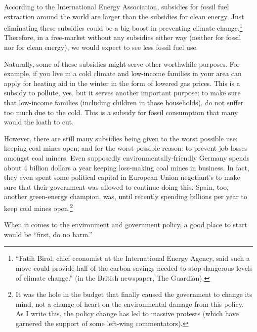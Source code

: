 According to the International Energy Association, subsidies for fossil fuel
extraction around the world are larger than the subsidies for clean energy.
Just eliminating these subsidies could be a big boost in preventing climate
change.\footnote{``Fatih Birol, chief
economist at the International Energy Agency, said such a move could
provide half of the carbon savings needed to stop dangerous levels of climate
change.'' (in the British newspaper, The Guardian).%
} Therefore, in a free-market without any subsidies either way (neither for
fossil nor for clean energy), we would expect to see less fossil fuel use.

Naturally, some of these subsidies might serve other worthwhile purposes. For
example, if you live in a cold climate and low-income families in your area can
apply for heating aid in the winter in the form of lowered gas prices. This is
a subsidy to pollute, yes, but it serves another important purpose: to make
sure that low-income families (including children in those households), do not
suffer too much due to the cold. This is a subsidy for fossil consumption that
many would the loath to cut.


However, there are still many subsidies being given to the worst possible use:
keeping coal mines open; and for the worst possible reason: to prevent job
losses amongst coal miners. Even supposedly environmentally-friendly Germany
spends about 4 billion dollars a year keeping loss-making coal mines in
business. In fact, they even spent some political capital in European Union
negotiant's to make sure that their government was allowed to continue doing
this. Spain, too, another green-energy champion, was, until recently spending
billions per year to keep coal mines open.\footnote{It was the hole in the
budget that finally caused the government to change its mind, not a change of
heart on the environmental damage from this policy. As I write this, the policy
change has led to massive protests (which have garnered the support of some
left-wing commentators).}

When it comes to the environment and government policy, a good place to start
would be ``first, do no harm.''

